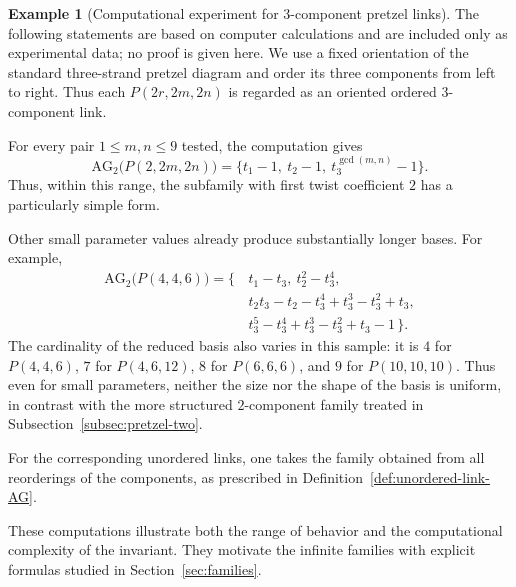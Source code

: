 \documentclass{article}
\theoremstyle{definition}
\newtheorem{example}[definition]{Example}
\theoremstyle{plain}
\DeclareMathOperator{\gcdop}{gcd}
\newcommand{\AG}{\mathrm{AG}}
\begin{document}
\begin{example}[Computational experiment for \(3\)-component pretzel links]
\label{ex:3pretzel-experiment}
The following statements are based on computer calculations and are included
only as experimental data; no proof is given here. We use a fixed orientation
of the standard three-strand pretzel diagram and order its three components
from left to right. Thus each \(P(2r,2m,2n)\) is regarded as an oriented
ordered \(3\)-component link.

For every pair \(1\le m,n\le9\) tested, the computation gives
\[
\AG_2\bigl(P(2,2m,2n)\bigr)
 =\{t_1-1,\ t_2-1,\ t_3^{\gcdop(m,n)}-1\}.
\]
Thus, within this range, the subfamily with first twist coefficient \(2\) has
a particularly simple form.

Other small parameter values already produce substantially longer bases. For
example,
\[
\begin{aligned}
\AG_2\bigl(P(4,4,6)\bigr)
=\{\,&t_1-t_3,\ t_2^2-t_3^4,\\
    &t_2t_3-t_2-t_3^4+t_3^3-t_3^2+t_3,\\
    &t_3^5-t_3^4+t_3^3-t_3^2+t_3-1\,\}.
\end{aligned}
\]
The cardinality of the reduced basis also varies in this sample: it is \(4\)
for \(P(4,4,6)\), \(7\) for \(P(4,6,12)\), \(8\) for \(P(6,6,6)\), and
\(9\) for \(P(10,10,10)\). Thus even for small parameters, neither the size
nor the shape of the basis is uniform, in contrast with the more structured
\(2\)-component family treated in
Subsection~\ref{subsec:pretzel-two}.

For the corresponding unordered links, one takes the family obtained from
all reorderings of the components, as prescribed in
Definition~\ref{def:unordered-link-AG}.
\end{example}

These computations illustrate both the range of behavior and the
computational complexity of the invariant. They motivate the infinite
families with explicit formulas studied in Section~\ref{sec:families}.

%
\end{document}
